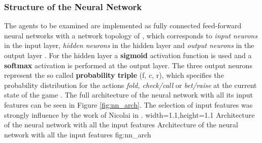 \subsubsection{Structure of the Neural Network}
The agents to be examined are implemented as fully connected feed-forward neural networks with a network topology of , which corresponds to  \textit{input neurons} in the input layer,  \textit{hidden neurons} in the hidden layer and  \textit{output neurons} in the output layer \cite{ENN_garrett}. For the hidden layer a \textbf{sigmoid} activation function is used and a \textbf{softmax}  activation is performed at the output layer. The three output neurons represent the so called \textbf{probability triple} (f, c, r), which specifies the probability distribution for the actions \textit{fold, check/call} or \textit{bet/raise} at the current state of the game \cite{review}. The full architecture of the neural network with all its input features can be seen in Figure \ref{fig:nn_arch}. The selection of input features was strongly influence by the work of Nicolai in \cite{evolutionary_methods}. 
  {width=1.1\textwidth,height=1.1\textheight}%
  {Architecture of the neural network with all the input features}%
  {Architecture of the neural network with all the input features}%
  {fig:nn_arch}%
